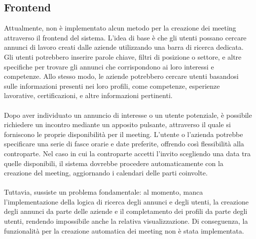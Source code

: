 \subsection{Frontend}
Attualmente, non è implementato alcun metodo per la creazione dei meeting attraverso il frontend del sistema. 
L'idea di base è che gli utenti possano cercare annunci di lavoro creati dalle aziende utilizzando una barra di ricerca dedicata.
Gli utenti potrebbero inserire parole chiave, filtri di posizione o settore, e altre specifiche per trovare gli annunci 
che corrispondono ai loro interessi e competenze. Allo stesso modo, le aziende potrebbero cercare utenti basandosi 
sulle informazioni presenti nei loro profili, come competenze, esperienze lavorative, certificazioni, e altre informazioni pertinenti. 
\\
\\
Dopo aver individuato un annuncio di interesse o un utente potenziale, è possibile richiedere un incontro 
mediante un apposito pulsante, attraverso il quale si forniscono le proprie disponibilità per il meeting. 
L'utente o l'azienda potrebbe specificare una serie di fasce orarie e date preferite, offrendo così flessibilità alla controparte. 
Nel caso in cui la controparte accetti l'invito scegliendo una data tra quelle disponibili, il sistema 
dovrebbe procedere automaticamente con la creazione del meeting, aggiornando i calendari delle parti coinvolte.
\\
\\
Tuttavia, sussiste un problema fondamentale: al momento, manca l'implementazione della logica di ricerca degli annunci 
e degli utenti, la creazione degli annunci da parte delle aziende e il completamento dei profili da parte degli utenti, 
rendendo impossibile anche la relativa visualizzazione. Di conseguenza, la funzionalità per la creazione automatica 
dei meeting non è stata implementata.